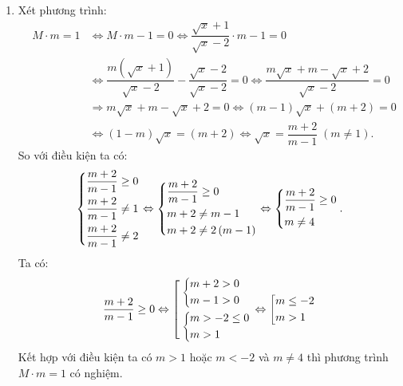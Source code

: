 \begin{bt}
{\begin{enumerate}
			\item Xét phương trình:
			\begin{eqnarray*}
				& M \cdot m = 1 & \Leftrightarrow M \cdot m - 1 = 0 \Leftrightarrow \dfrac{\sqrt x  + 1}{\sqrt x  - 2} \cdot m - 1 = 0 \\
				& & \Leftrightarrow \dfrac{m\left( \sqrt x  + 1 \right)}{\sqrt x  - 2} - \dfrac{\sqrt x  - 2}{\sqrt x  - 2} = 0 \Leftrightarrow \dfrac{m\sqrt x  + m - \sqrt x  + 2}{\sqrt x  - 2} = 0 \\
				& & \Rightarrow m\sqrt x  + m - \sqrt x  + 2 = 0 \Leftrightarrow \left( m - 1 \right)\sqrt x  + \left( m + 2 \right) = 0 \\
				& & \Leftrightarrow \left( 1 - m \right)\sqrt x  = \left( m + 2 \right) \Leftrightarrow \sqrt x  = \dfrac{m + 2}{m - 1}\;\left( m \ne 1 \right).
			\end{eqnarray*}
			So với điều kiện ta có:
			$$\left\{\begin{aligned}& \dfrac{m + 2}{m - 1} \ge 0 \\& \dfrac{m + 2}{m - 1} \ne 1 \\& \dfrac{m + 2}{m - 1} \ne 2\end{aligned}\right. \Leftrightarrow 
			\left\{\begin{aligned}& \dfrac{m + 2}{m - 1} \ge 0 \\& m + 2 \ne m - 1 \\& m + 2 \ne 2\left( m - 1 \right) \end{aligned}\right. \Leftrightarrow \left\{\begin{aligned}& \dfrac{m + 2}{m - 1} \ge 0 \\& m \ne 4 \end{aligned}\right. .$$
			Ta có:
			$$ \dfrac{m + 2}{m - 1} \ge 0 \Leftrightarrow \left[\begin{aligned}& \left\{\begin{aligned}& m + 2 > 0 \\& m - 1 > 0 \end{aligned}\right. \\& \left\{\begin{aligned}& m >  - 2 \le 0 \\& m > 1\end{aligned}\right. \end{aligned}\right. \Leftrightarrow \left[\begin{aligned}& m \le  - 2 \\& m > 1 \end{aligned}\right. $$
			Kết hợp với điều kiện ta có $m > 1$ hoặc $m <  - 2$ và $m \ne 4$ thì phương trình $M \cdot m = 1$ có nghiệm.
		\end{enumerate}
	}
\end{bt}

